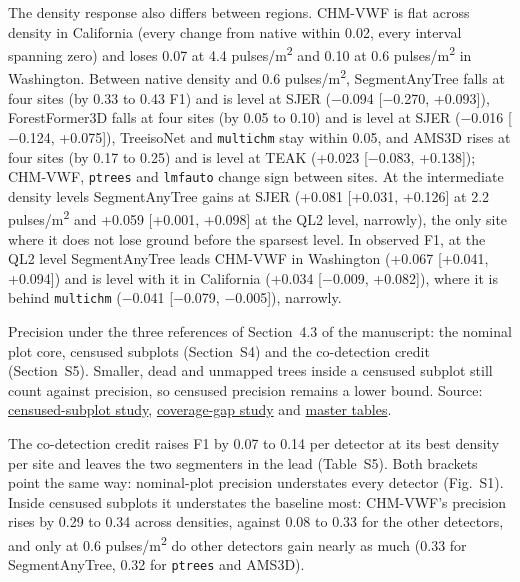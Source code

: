 \documentclass[10pt,a4paper]{article}
\makeatletter
\newcommand\suppFloatBarrier{\par\addpenalty\z@
  \ifx\@deferlist\@empty\else\expandafter\supp@flush\fi}
\newcommand\supp@flush{\let\supp@waiting\@deferlist
  \newpage
  \ifx\@deferlist\supp@waiting\null\newpage\fi
  \ifx\@deferlist\supp@waiting\expandafter\clearpage\else\expandafter\suppFloatBarrier\fi}
\gdef\supp@afterheading{}
\renewcommand\section{\suppFloatBarrier
    \gdef\supp@afterheading{\suppressfloats[t]\gdef\supp@afterheading{}}\supp@section}}
\makeatother
\begin{document}
The density response also differs between regions. CHM-VWF is flat across
density in California (every change from native within 0.02, every interval
spanning zero) and loses 0.07 at 4.4 pulses/m\textsuperscript{2} and 0.10 at 0.6 pulses/m\textsuperscript{2} in
Washington. Between native density and 0.6 pulses/m\textsuperscript{2}, SegmentAnyTree falls at
four sites (by 0.33 to 0.43 F1) and is level at SJER ($-$0.094 [$-$0.270, +0.093]),
ForestFormer3D falls at four sites (by 0.05 to 0.10) and is level at SJER
($-$0.016 [$-$0.124, +0.075]), TreeisoNet and \texttt{multichm} stay within 0.05, and AMS3D
rises at four sites (by 0.17 to 0.25) and is level at TEAK (+0.023 [$-$0.083,
+0.138]); CHM-VWF, \texttt{ptrees} and \texttt{lmfauto} change sign between sites. At the
intermediate density levels SegmentAnyTree gains at SJER (+0.081 [+0.031,
+0.126] at 2.2 pulses/m\textsuperscript{2} and +0.059 [+0.001, +0.098] at the QL2 level,
narrowly), the only site where it does not lose ground before the sparsest
level. In observed F1, at the QL2 level SegmentAnyTree leads CHM-VWF in
Washington (+0.067 [+0.041, +0.094]) and is level with it in California (+0.034
[$-$0.009, +0.082]), where it is behind \texttt{multichm} ($-$0.041 [$-$0.079, $-$0.005]),
narrowly.

\section*{S20. Precision under three references}

Precision under the three references of Section~4.3 of the manuscript: the
nominal plot core, censused subplots (Section~S4) and the co-detection credit
(Section~S5). Smaller, dead and unmapped trees inside a censused subplot still
count against precision, so censused precision remains a lower bound. Source:
\href{https://github.com/devakellc/lidar-tree-benchmark/blob/main/results/census-support-results.md}{censused-subplot study}, \href{https://github.com/devakellc/lidar-tree-benchmark/blob/main/results/coverage-gap-results.md}{coverage-gap
study} and \href{https://github.com/devakellc/lidar-tree-benchmark/blob/main/results/master-tables-results.md}{master
tables}.

The co-detection credit raises F1 by 0.07 to 0.14 per detector at its best
density per site and leaves the two segmenters in the lead (Table~S5). Both
brackets point the same way: nominal-plot precision understates every detector
(Fig.~S1). Inside censused subplots it understates the baseline most: CHM-VWF's
precision rises by 0.29 to 0.34 across densities, against 0.08 to 0.33 for the
other detectors, and only at 0.6 pulses/m\textsuperscript{2} do other detectors gain nearly as
much (0.33 for SegmentAnyTree, 0.32 for \texttt{ptrees} and AMS3D).
\end{document}
